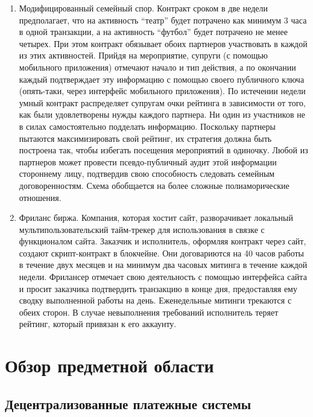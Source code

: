 \documentclass[]{itmo-student-thesis}
\begin{document}
\begin{enumerate}
  \item Модифицированный семейный спор. Контракт сроком в две недели
    предполагает, что на активность ``театр'' будет потрачено как
    минимум 3 часа в одной транзакции, а на активность ``футбол''
    будет потрачено не менее четырех. При этом контракт обязывает
    обоих партнеров участвовать в каждой из этих активностей. Прийдя
    на мероприятие, супруги (с помощью мобильного приложения) отмечают
    начало и тип действия, а по окончании каждый подтверждает эту
    информацию с помощью своего публичного ключа (опять-таки, через
    интерфейс мобильного приложения). По истечении недели умный
    контракт распределяет супругам очки рейтинга в зависимости от
    того, как были удовлетворены нужды каждого партнера. Ни один из
    участников не в силах самостоятельно подделать
    информацию. Поскольку партнеры пытаются максимизировать свой
    рейтинг, их стратегия должна быть построена так, чтобы избегать
    посещения мероприятий в одиночку. Любой из партнеров может
    провести псевдо-публичный аудит этой информации стороннему лицу,
    подтвердив свою способность следовать семейным
    договоренностям. Схема обобщается на более сложные полиаморические
    отношения.
  \item Фриланс биржа. Компания, которая хостит сайт, разворачивает
    локальный мультипользовательский тайм-трекер для использования в
    связке с функционалом сайта. Заказчик и исполнитель, оформляя
    контракт через сайт, создают скрипт-контракт в блокчейне. Они
    договариются на 40 часов работы в течение двух месяцев и на
    минимум два часовых митинга в течение каждой недели. Фрилансер
    отмечает свою деятельность с помощью интерфейса сайта и просит
    заказчика подтвердить транзакцию в конце дня, предоставляя ему
    сводку выполненной работы на день. Еженедельные митинги трекаются
    с обеих сторон. В случае невыполнения требований исполнитель
    теряет рейтинг, который привязан к его аккаунту.
\end{enumerate}

\chapter{Обзор предметной области}

\section{Децентрализованные платежные системы}
\end{document}
